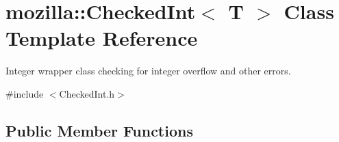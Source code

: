 \hypertarget{classmozilla_1_1_checked_int}{\section{mozilla\-:\-:Checked\-Int$<$ T $>$ Class Template Reference}
\label{classmozilla_1_1_checked_int}
}


Integer wrapper class checking for integer overflow and other errors.  




{\ttfamily \#include $<$Checked\-Int.\-h$>$}

\subsection*{Public Member Functions}

